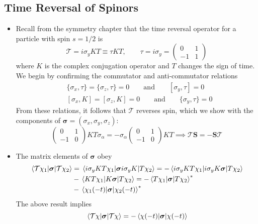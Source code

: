 \documentclass[11pt, a4paper]{article}
\newcommand{\eqtext}[1]{\qquad \text{#1} \qquad}
\renewcommand{\vec}[1]{\bm{#1}}  %
\renewcommand{\S}{\vec{S}}  %
\newcommand{\T}{\mathcal{T}}  %
\begin{document}
\subsection{Time Reversal of Spinors}
\begin{itemize}
	\item Recall from the symmetry chapter that the time reversal operator for a particle with spin $ s = 1/2 $ is 
	\begin{equation*}
		\T = i \sigma_{y} KT \equiv \tau KT, \qquad \tau = i \sigma_{y} =
		\begin{pmatrix}
			0 & 1\\
			-1 & 1
		\end{pmatrix}
	\end{equation*}
	where $ K $ is the complex conjugation operator and $ T $ changes the sign of time. We begin by confirming the commutator and anti-commutator relations
	\begin{align*}
		&\{\sigma_{x}, \tau\} = \{\sigma_{z}, \tau\} = 0 \eqtext{and} [\sigma_{y}, \tau] = 0\\
		&[\sigma_{x}, K] = [\sigma_{z}, K] = 0 \eqtext{and} \{\sigma_{y}, \tau\} = 0
	\end{align*}
	From these relations, it follows that $ \T $ reverses spin, which we show with the components of $ \vec{\sigma} = (\sigma_{x}, \sigma_{y}, \sigma_{z}) $:
	\begin{equation*}
		\begin{pmatrix}
			0 & 1\\
			-1 & 0
		\end{pmatrix}
		K T \sigma_{\alpha} = - \sigma_{\alpha}
		\begin{pmatrix}
			0 & 1\\
			-1 & 0
		\end{pmatrix}
		KT
		\implies \T \S = - \S \T
	\end{equation*}
	
	\item The matrix elements of $ \vec{\sigma} $ obey
	\begin{align*}
		\mel{\T \chi_{1}}{\vec{\sigma}}{\T \chi_{2}} &= \mel{i\sigma_{y}KT\chi_{1}}{\vec{\sigma}i \sigma_{y}K}{T\chi_{2}} = - \mel{i\sigma_{y}KT\chi_{1}}{i \sigma_{y}K \vec{\sigma}}{T\chi_{2}} \\
		& - \mel{KT\chi_{1}}{K \vec{\sigma}}{T\chi_{2}} = -\mel{T\chi_{1}}{\vec{\sigma}}{T\chi_{2}}^{*}\\
		& -\mel{\chi_{1}(-t)}{\vec{\sigma}}{\chi_{2}(-t)}^{*}
	\end{align*}
	The above result implies
	\begin{equation*}
		\mel{\T \chi}{\vec{\sigma}}{\T \chi} = -\mel{\chi(-t)}{\vec{\sigma}}{\chi(-t)}
	\end{equation*}
	

\end{itemize}
\end{document}
